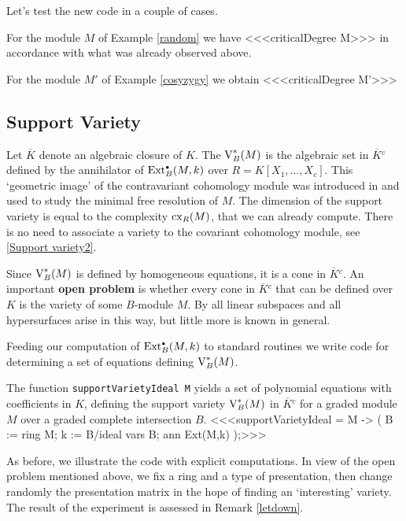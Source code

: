 Let's test the new code in a couple of cases.

\begin{sExample}
For the module $M$ of Example \ref{random} we have
<<<criticalDegree M>>>
in accordance with what was already observed above.

For the module $M'$ of Example \ref{cosyzygy} we obtain
<<<criticalDegree M'>>>
\end{sExample}

\subsection{Support Variety}
\label{Support variety}

Let $\overline K$ denote an algebraic closure of $K$.  The
{\it{}\/} $\operatorname{V}^*_B(M)$ is the algebraic set in
${\overline K}{}^c$ defined by the annihilator of $\operatorname{Ext}^{\scriptscriptstyle\bullet}_B(M,k)$
over $R=K[X_1,\dots,X_c]$.  This `geometric image' of the
contravariant cohomology module was introduced in \cite{CI:MR90g:13027}
and used to study the minimal free resolution of $M$.  The dimension of
the support variety is equal to the complexity $\operatorname{cx}_R(M)$, that we can
already compute.  There is no need to associate a variety to the
covariant cohomology module, see \ref{Support variety2}.

Since $\operatorname{V}^*_B(M)$ is defined by homogeneous equations, it is a cone
in ${\overline K}{}^c$.  An important {\bf open problem} is whether
every cone in ${\overline K}{}^c$ that can be defined over $K$ is the
variety of some $B$-module $M$.  By \cite[Sect.~6]{CI:MR90g:13027} all
linear subspaces and all hypersurfaces arise in this way, but little
more is known in general.

Feeding our computation of $\operatorname{Ext}^{\scriptscriptstyle\bullet}_B(M,k)$ to standard \Mtwo routines
we write code for determining a set of equations defining $\operatorname{V}^*_B(M)$.

\begin{sCode}
The function {\tt supportVarietyIdeal M} yields a set of polynomial
equations with coefficients in $K$, defining the support variety
$\operatorname{V}^*_B(M)$ in ${\overline K}{}^c$ for a graded module $M$ over a
graded complete intersection $B$.
<<<supportVarietyIdeal = M -> (
   B := ring M;
   k := B/ideal vars B;
   ann Ext(M,k)
   );>>>
 \end{sCode}

As before, we illustrate the code with explicit computations.  In
view of the open problem mentioned above, we fix a ring and a type of
presentation, then change randomly the presentation matrix in the hope
of finding an `interesting' variety.  The result of the experiment
is assessed in Remark \ref{letdown}.

